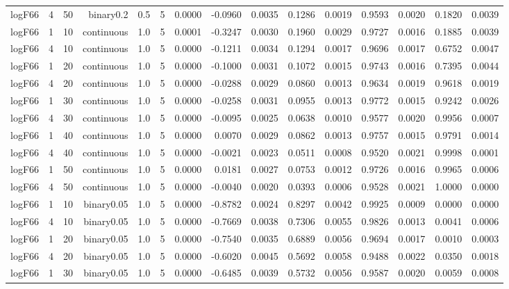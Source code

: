 \begin{longtable}{rrrrrrrrrrrrrrr}
  logF66 & 4 & 50 & binary0.2 & 0.5 & 5 & 0.0000 & -0.0960 & 0.0035 & 0.1286 & 0.0019 & 0.9593 & 0.0020 & 0.1820 & 0.0039 \\ 
  logF66 & 1 & 10 & continuous & 1.0 & 5 & 0.0001 & -0.3247 & 0.0030 & 0.1960 & 0.0029 & 0.9727 & 0.0016 & 0.1885 & 0.0039 \\ 
  logF66 & 4 & 10 & continuous & 1.0 & 5 & 0.0000 & -0.1211 & 0.0034 & 0.1294 & 0.0017 & 0.9696 & 0.0017 & 0.6752 & 0.0047 \\ 
  logF66 & 1 & 20 & continuous & 1.0 & 5 & 0.0000 & -0.1000 & 0.0031 & 0.1072 & 0.0015 & 0.9743 & 0.0016 & 0.7395 & 0.0044 \\ 
  logF66 & 4 & 20 & continuous & 1.0 & 5 & 0.0000 & -0.0288 & 0.0029 & 0.0860 & 0.0013 & 0.9634 & 0.0019 & 0.9618 & 0.0019 \\ 
  logF66 & 1 & 30 & continuous & 1.0 & 5 & 0.0000 & -0.0258 & 0.0031 & 0.0955 & 0.0013 & 0.9772 & 0.0015 & 0.9242 & 0.0026 \\ 
  logF66 & 4 & 30 & continuous & 1.0 & 5 & 0.0000 & -0.0095 & 0.0025 & 0.0638 & 0.0010 & 0.9577 & 0.0020 & 0.9956 & 0.0007 \\ 
  logF66 & 1 & 40 & continuous & 1.0 & 5 & 0.0000 & 0.0070 & 0.0029 & 0.0862 & 0.0013 & 0.9757 & 0.0015 & 0.9791 & 0.0014 \\ 
  logF66 & 4 & 40 & continuous & 1.0 & 5 & 0.0000 & -0.0021 & 0.0023 & 0.0511 & 0.0008 & 0.9520 & 0.0021 & 0.9998 & 0.0001 \\ 
  logF66 & 1 & 50 & continuous & 1.0 & 5 & 0.0000 & 0.0181 & 0.0027 & 0.0753 & 0.0012 & 0.9726 & 0.0016 & 0.9965 & 0.0006 \\ 
  logF66 & 4 & 50 & continuous & 1.0 & 5 & 0.0000 & -0.0040 & 0.0020 & 0.0393 & 0.0006 & 0.9528 & 0.0021 & 1.0000 & 0.0000 \\ 
  logF66 & 1 & 10 & binary0.05 & 1.0 & 5 & 0.0000 & -0.8782 & 0.0024 & 0.8297 & 0.0042 & 0.9925 & 0.0009 & 0.0000 & 0.0000 \\ 
  logF66 & 4 & 10 & binary0.05 & 1.0 & 5 & 0.0000 & -0.7669 & 0.0038 & 0.7306 & 0.0055 & 0.9826 & 0.0013 & 0.0041 & 0.0006 \\ 
  logF66 & 1 & 20 & binary0.05 & 1.0 & 5 & 0.0000 & -0.7540 & 0.0035 & 0.6889 & 0.0056 & 0.9694 & 0.0017 & 0.0010 & 0.0003 \\ 
  logF66 & 4 & 20 & binary0.05 & 1.0 & 5 & 0.0000 & -0.6020 & 0.0045 & 0.5692 & 0.0058 & 0.9488 & 0.0022 & 0.0350 & 0.0018 \\ 
  logF66 & 1 & 30 & binary0.05 & 1.0 & 5 & 0.0000 & -0.6485 & 0.0039 & 0.5732 & 0.0056 & 0.9587 & 0.0020 & 0.0059 & 0.0008 \\ 

\end{longtable}
